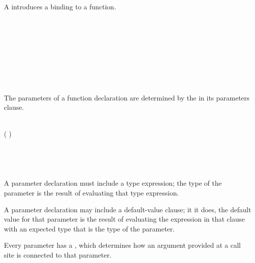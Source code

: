 
A  introduces a binding to a function.

\begin{Syntax}
     \\
          \\
            \SynOpt \\
             \\
            \SynOpt \\
            \SynOpt \\
             \\
\end{Syntax}


The parameters of a function declaration are determined by the  in its parameters clause.

\begin{Syntax}
     \\
        \code{(} ( \code{,}) \SynStar \code{)}

     \\
         \code{:} \SynOpt {} \SynOpt

     \\
        \code{=} 
\end{Syntax}

A parameter declaration must include a type expression; the type of the parameter is the result of evaluating that type expression.

A parameter declaration may include a default-value clause; it it does, the default value for that parameter is the result of evaluating the expression in that clause with an expected type that is the type of the parameter.


Every parameter has a , which determines how an argument provided at a call site is connected to that parameter.

\begin{Syntax}
     \\
         \\
        \SynOr {} \\
        \SynOr {} \\
        \SynOr {} \\
        \SynOr {} \SynOr {} \\
        \SynOr {} \\
\end{Syntax}

